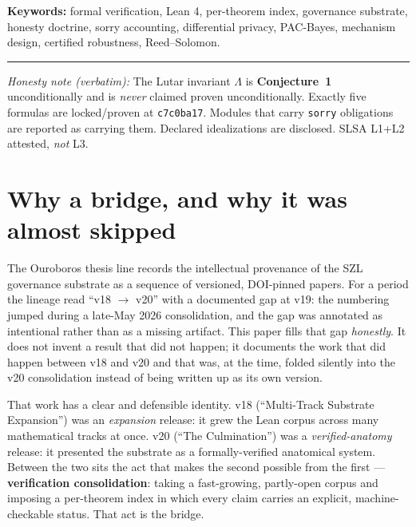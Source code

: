 \documentclass[11pt]{article}
\theoremstyle{plain}
\theoremstyle{definition}
\theoremstyle{remark}
\newcommand{\La}{\Lambda}
\begin{document}
\noindent\textbf{Keywords:} formal verification, Lean 4, per-theorem index, governance
substrate, honesty doctrine, sorry accounting, differential privacy, PAC-Bayes,
mechanism design, certified robustness, Reed--Solomon.

\vspace{0.5em}\hrule\vspace{0.5em}
\noindent\small\textit{Honesty note (verbatim):} The Lutar invariant $\La$ is
\textbf{Conjecture~1} unconditionally and is \emph{never} claimed proven
unconditionally. Exactly five formulas are locked/proven at \texttt{c7c0ba17}.
Modules that carry \texttt{sorry} obligations are reported as carrying them. Declared
idealizations are disclosed. SLSA L1+L2 attested, \emph{not} L3.
\normalsize

\tableofcontents
\newpage

\section{Why a bridge, and why it was almost skipped}
\label{sec:intro}

The Ouroboros thesis line records the intellectual provenance of the SZL governance
substrate as a sequence of versioned, DOI-pinned papers. For a period the lineage
read ``v18 $\to$ v20'' with a documented gap at v19: the numbering jumped during a
late-May 2026 consolidation, and the gap was annotated as intentional rather than as
a missing artifact. This paper fills that gap \emph{honestly}. It does not invent a
result that did not happen; it documents the work that did happen between v18 and v20
and that was, at the time, folded silently into the v20 consolidation instead of
being written up as its own version.

That work has a clear and defensible identity. v18 (``Multi-Track Substrate
Expansion'') was an \emph{expansion} release: it grew the Lean corpus across many
mathematical tracks at once. v20 (``The Culmination'') was a \emph{verified-anatomy}
release: it presented the substrate as a formally-verified anatomical system. Between
the two sits the act that makes the second possible from the first ---
\textbf{verification consolidation}: taking a fast-growing, partly-open corpus and
imposing a per-theorem index in which every claim carries an explicit, machine-checkable
status. That act is the bridge.
\end{document}

